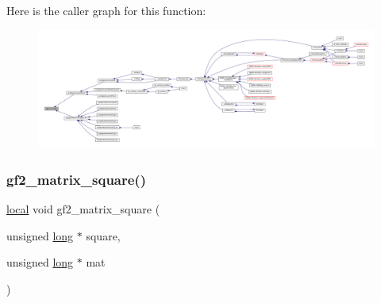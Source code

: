 Here is the caller graph for this function\+:
\nopagebreak
\begin{figure}[H]
\begin{center}
\leavevmode
\includegraphics[width=350pt]{third-party_2zlib_2crc32_8c_a7d4540ffeee6cb5c74978e3040b7a69a_icgraph}
\end{center}
\end{figure}
\mbox{\label{third-party_2zlib_2crc32_8c_a797362ba54180ad549b381abfcde80c3}} 
\subsubsection{\texorpdfstring{gf2\+\_\+matrix\+\_\+square()}{gf2\_matrix\_square()}}
{\footnotesize\ttfamily \mbox{\hyperlink{zutil_8h_a08023ea6765c99d60a6a3840cd07156e}{local}} void gf2\+\_\+matrix\+\_\+square (\begin{DoxyParamCaption}\item[{unsigned \mbox{\hyperlink{ioapi_8h_a3c7b35ad9dab18b8310343c201f7b27e}{long}} $\ast$}]{square,  }\item[{unsigned \mbox{\hyperlink{ioapi_8h_a3c7b35ad9dab18b8310343c201f7b27e}{long}} $\ast$}]{mat }\end{DoxyParamCaption})}

